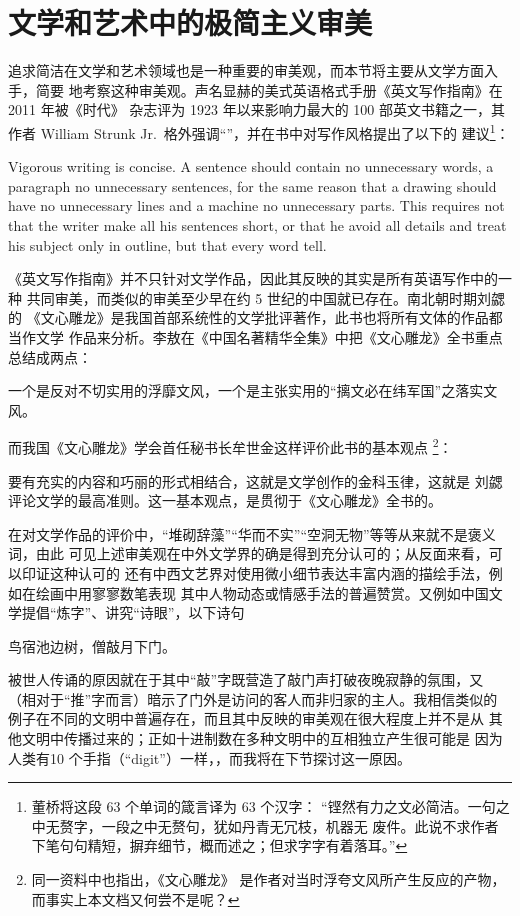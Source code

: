 \section{文学和艺术中的极简主义审美}\label{sec:art}

追求简洁在文学和艺术领域也是一种重要的审美观，而本节将主要从文学方面入手，简要
地考察这种审美观。声名显赫的美式英语格式手册《英文写作指南》在 2011 年被《时代》
杂志评为 1923 年以来影响力最大的 100 部英文书籍之一，其作者 William Strunk
Jr.\ 格外强调“”，并在书中对写作风格提出了以下的
建议\footnote{董桥将这段 63 个单词的箴言译为 63 个汉字：
“铿然有力之文必简洁。一句之中无赘字，一段之中无赘句，犹如丹青无冗枝，机器无
废件。此说不求作者下笔句句精短，摒弃细节，概而述之；但求字字有着落耳。”}：
\begin{quoting}
	Vigorous writing is concise.  A sentence should contain no
	unnecessary words, a paragraph no unnecessary sentences, for the
	same reason that a drawing should have no unnecessary lines and
	a machine no unnecessary parts.  This requires not that the writer
	make all his sentences short, or that he avoid all details and
	treat his subject only in outline, but that every word tell.
\end{quoting}

《英文写作指南》并不只针对文学作品，因此其反映的其实是所有英语写作中的一种
共同审美，而类似的审美至少早在约 5 世纪的中国就已存在。南北朝时期刘勰的
《文心雕龙》是我国首部系统性的文学批评著作，此书也将所有文体的作品都当作文学
作品来分析。李敖在《中国名著精华全集》中把《文心雕龙》全书重点总结成两点：
\begin{quoting}
	一个是反对不切实用的浮靡文风，一个是主张实用的“摛文必在纬军国”之落实文风。
\end{quoting}
而我国《文心雕龙》学会首任秘书长牟世金这样评价此书的基本观点%
\footnote{同一资料中也指出，《文心雕龙》
是作者对当时浮夸文风所产生反应的产物，而事实上本文档又何尝不是呢？}：
\begin{quoting}
	要有充实的内容和巧丽的形式相结合，这就是文学创作的金科玉律，这就是
	刘勰评论文学的最高准则。这一基本观点，是贯彻于《文心雕龙》全书的。
\end{quoting}

在对文学作品的评价中，“堆砌辞藻”“华而不实”“空洞无物”等等从来就不是褒义词，由此
可见上述审美观在中外文学界的确是得到充分认可的；从反面来看，可以印证这种认可的
还有中西文艺界对使用微小细节表达丰富内涵的描绘手法，例如在绘画中用寥寥数笔表现
其中人物动态或情感手法的普遍赞赏。又例如中国文学提倡“炼字”、讲究“诗眼”，以下诗句
\begin{quoting}
	鸟宿池边树，僧敲月下门。
\end{quoting}
被世人传诵的原因就在于其中“敲”字既营造了敲门声打破夜晚寂静的氛围，又
（相对于“推”字而言）暗示了门外是访问的客人而非归家的主人。我相信类似的
例子在不同的文明中普遍存在，而且其中反映的审美观在很大程度上并不是从
其他文明中传播过来的；正如十进制数在多种文明中的互相独立产生很可能是
因为人类有10 个手指（“digit”）一样，，而我将在下节探讨这一原因。

